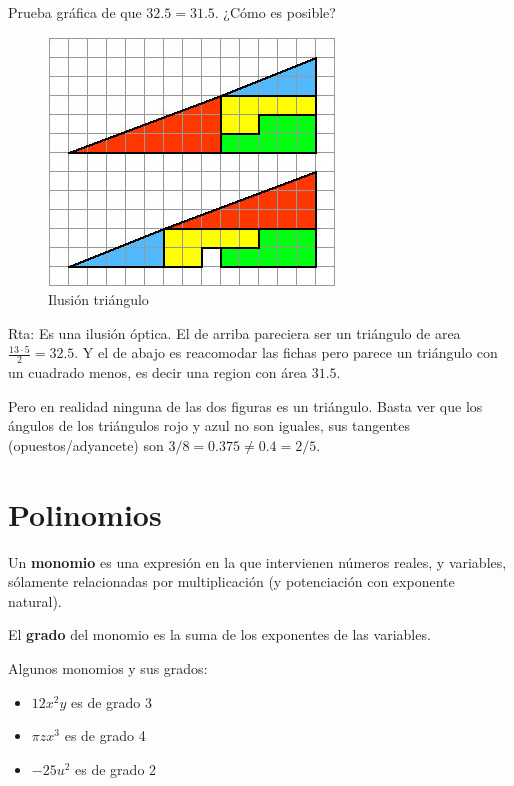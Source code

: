 \begin{problem}
Prueba gráfica de que $32.5 = 31.5$.  ¿Cómo es posible?
\end{problem}

\begin{figure}[h]
\centering\includegraphics[scale=0.6]{images/01_precalculo/ilusion_triangulo.jpg}
\caption{Ilusión triángulo}
\end{figure}

Rta: Es una ilusión óptica.  El de arriba pareciera ser un triángulo de area $ \frac{13 \cdot 5}{2} = 32.5$.  Y el de abajo es reacomodar las fichas pero parece un triángulo con un cuadrado menos, es decir una region con área $31.5$.  

Pero en realidad ninguna de las dos figuras es un triángulo.  Basta ver que los ángulos de los triángulos rojo y azul no son iguales, sus tangentes (opuestos/adyancete) son $3/8 = 0.375 \neq 0.4 = 2/5 $.



\chapter{Polinomios}

\begin{definition}[Monomio] 
Un \textbf{monomio} es una expresión en la que intervienen números reales, y variables, sólamente relacionadas por multiplicación (y potenciación con exponente natural).  

El \textbf{grado} del monomio es la suma de los exponentes de las variables.
\end{definition}

\begin{example}
Algunos monomios y sus grados:

\begin{itemize}
\item $12x^2y$ es de grado 3
\item $\pi z x^3$ es de grado 4
\item $-25 u^2$ es de grado 2
\end{itemize}
\end{example}

